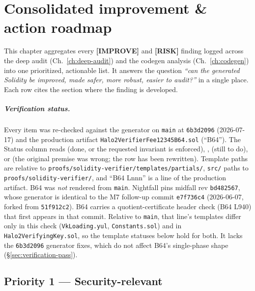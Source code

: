 \chapter{Consolidated improvement \& action roadmap}
\label{ch:roadmap}

This chapter aggregates every \textcolor{codegenblue}{\textbf{[IMPROVE]}}
and \textcolor{rustorange}{\textbf{[RISK]}} finding logged across the
deep audit (Ch.~\ref{ch:deep-audit}) and the codegen analysis
(Ch.~\ref{ch:codegen}) into one prioritized, actionable list. It answers
the question \emph{``can the generated Solidity be improved, made safer,
more robust, easier to audit?''} in a single place. Each row cites the
section where the finding is developed.

\paragraph{Verification status.} Every item was re-checked against the
generator on \texttt{main} at \texttt{6b3d2096} (2026-07-17) and the
production artifact \texttt{Halo2VerifierFee12345B64.sol} (``B64'').
The Status column reads  (done, or the requested
invariant is enforced), ,  (still to do),
or  (the original premise was wrong; the row has been
rewritten). Template paths are relative to
\texttt{proofs/\allowbreak{}solidity-verifier/\allowbreak{}templates/\allowbreak{}partials/\allowbreak{}}, \texttt{src/}
paths to \texttt{proofs/\allowbreak{}solidity-verifier/\allowbreak{}}, and ``B64 Lnnn'' is a line
of the production artifact. B64 was \emph{not} rendered from
\texttt{main}. Nightfall pins midfall rev \texttt{bd482567}, whose generator
is identical to the M7 follow-up commit \texttt{e7f736c4} (2026-06-07,
forked from \texttt{51f912c2}). B64 carries a quotient-certificate header
check (B64 L940) that first appears in that commit. Relative to \texttt{main}, that line's templates differ
only in this check (\texttt{VkLoading.yul}, \texttt{Constants.sol}) and in
\texttt{Halo2VerifyingKey.sol}, so the template statuses below hold for
both. It lacks the \texttt{6b3d2096} generator fixes, which do not affect
B64's single-phase shape (\S\ref{sec:verification-pass}).

\section{Priority 1 --- Security-relevant}
\label{sec:roadmap-p1}

